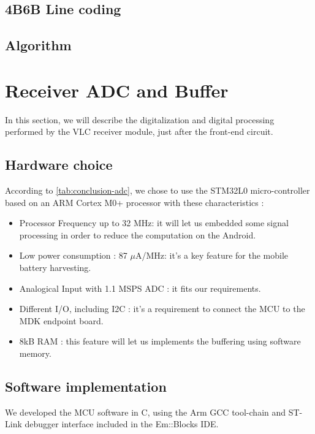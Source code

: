 \subsection{4B6B Line coding}
\subsection{Algorithm}



\section{Receiver ADC and Buffer}
In this section, we will describe the digitalization and digital processing performed by the VLC receiver module, just  after the front-end circuit.

\subsection{Hardware choice}

According to \ref{tab:conclusion-adc}, we chose to use the STM32L0 micro-controller based on an ARM Cortex  M0+ processor with these characteristics :
\begin{itemize}
\item Processor Frequency up to 32 MHz: it will let us embedded some signal processing in order to reduce the computation on the Android.
\item Low power consumption : 87 $\mu$A/MHz: it's a key feature for the mobile battery harvesting.
\item Analogical Input with 1.1 MSPS ADC : it fits our requirements.
\item Different I/O, including I2C : it's a requirement to connect the MCU to the MDK endpoint board.
\item 8kB RAM : this feature will let us implements the buffering using software memory.
\end{itemize}

\subsection{Software implementation}

We developed the MCU software in C, using the Arm GCC tool-chain and ST-Link debugger interface included in the Em::Blocks \citep{emblocks} IDE.

